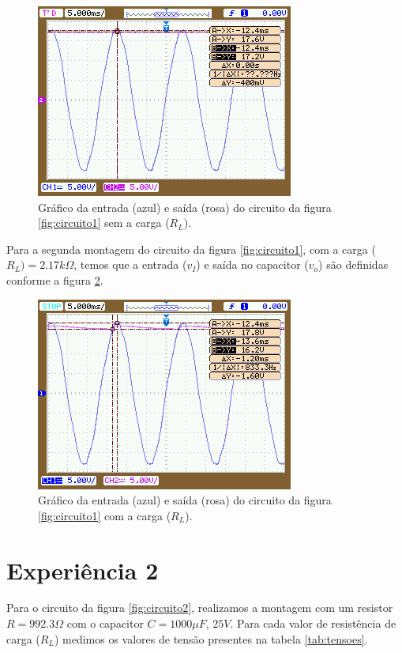 \documentclass{abntex2}
\begin{document}
\begin{figure}[h]
  \centering
  \includegraphics[scale = 0.7]{exp1-1.png}
  \caption{Gráfico da entrada (azul) e saída (rosa) do circuito da figura \ref{fig:circuito1} sem a carga ($R_L$).}
  \label{fig:io1}
\end{figure}

Para a segunda montagem do circuito da figura \ref{fig:circuito1}, com a carga ($R_L) = 2.17 k\Omega$, temos que a entrada ($v_I$) e saída no capacitor ($v_o$) são definidas conforme a figura \ref{fig:io2}.

\begin{figure}[h]
  \centering
  \includegraphics[scale = 0.7]{exp1-2.png}
  \caption{Gráfico da entrada (azul) e saída (rosa) do circuito da figura \ref{fig:circuito1} com a carga ($R_L$).}
  \label{fig:io2}
\end{figure}

\pagebreak
\section{Experiência 2}

Para o circuito da figura \ref{fig:circuito2}, realizamos a montagem com um resistor $R = 992.3\Omega$ com o capacitor $C = 1000\mu F$, $25V$. Para cada valor de resistência de carga ($R_L$) medimos os valores de tensão presentes na tabela \ref{tab:tensoes}.
\end{document}
